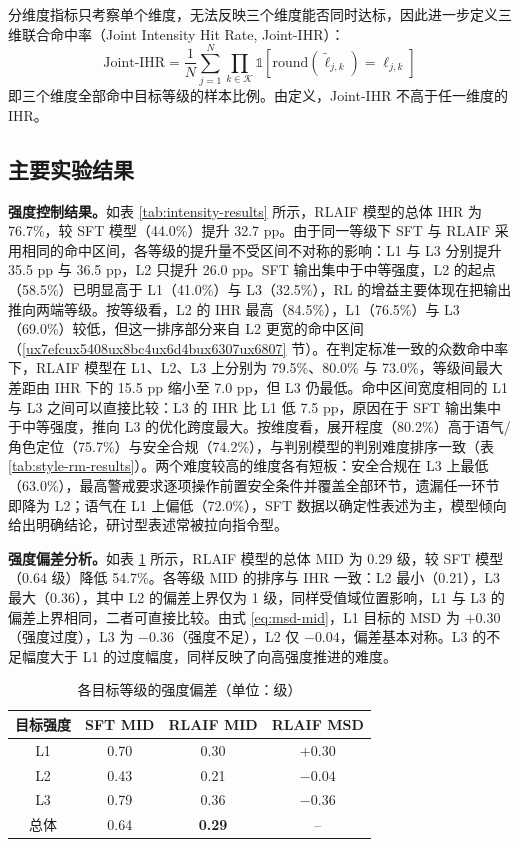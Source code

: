 \documentclass[fontset=fandol,type=master,campus=shenzhen,etitleauto=true]{hithesisbook}
\begin{document}
分维度指标只考察单个维度，无法反映三个维度能否同时达标，因此进一步定义三维联合命中率（Joint Intensity Hit Rate, Joint-IHR）：
\begin{equation}\label{eq:joint-ihr}
\text{Joint-IHR} = \frac{1}{N} \sum_{j=1}^{N} \prod_{k \in \mathcal{K}} \mathbb{1}\!\left[\text{round}(\tilde{\ell}_{j,k}) = \ell_{j,k}\right]
\end{equation}
即三个维度全部命中目标等级的样本比例。由定义，Joint-IHR 不高于任一维度的 IHR。

\subsection{主要实验结果}\label{ux4e3bux8981ux7ed3ux679c-1}

\textbf{强度控制结果。}如表 \ref{tab:intensity-results} 所示，RLAIF 模型的总体 IHR 为 76.7\%，较 SFT 模型（44.0\%）提升 32.7 pp。由于同一等级下 SFT 与 RLAIF 采用相同的命中区间，各等级的提升量不受区间不对称的影响：L1 与 L3 分别提升 35.5 pp 与 36.5 pp，L2 只提升 26.0 pp。SFT 输出集中于中等强度，L2 的起点（58.5\%）已明显高于 L1（41.0\%）与 L3（32.5\%），RL 的增益主要体现在把输出推向两端等级。按等级看，L2 的 IHR 最高（84.5\%），L1（76.5\%）与 L3（69.0\%）较低，但这一排序部分来自 L2 更宽的命中区间（\ref{ux7efcux5408ux8bc4ux6d4bux6307ux6807} 节）。在判定标准一致的众数命中率下，RLAIF 模型在 L1、L2、L3 上分别为 79.5\%、80.0\% 与 73.0\%，等级间最大差距由 IHR 下的 15.5 pp 缩小至 7.0 pp，但 L3 仍最低。命中区间宽度相同的 L1 与 L3 之间可以直接比较：L3 的 IHR 比 L1 低 7.5 pp，原因在于 SFT 输出集中于中等强度，推向 L3 的优化跨度最大。按维度看，展开程度（80.2\%）高于语气/角色定位（75.7\%）与安全合规（74.2\%），与判别模型的判别难度排序一致（表 \ref{tab:style-rm-results}）。两个难度较高的维度各有短板：安全合规在 L3 上最低（63.0\%），最高警戒要求逐项操作前置安全条件并覆盖全部环节，遗漏任一环节即降为 L2；语气在 L1 上偏低（72.0\%），SFT 数据以确定性表述为主，模型倾向给出明确结论，研讨型表述常被拉向指令型。

\textbf{强度偏差分析。}如表 \ref{tab:intensity-mid} 所示，RLAIF 模型的总体 MID 为 0.29 级，较 SFT 模型（0.64 级）降低 54.7\%。各等级 MID 的排序与 IHR 一致：L2 最小（0.21），L3 最大（0.36），其中 L2 的偏差上界仅为 1 级，同样受值域位置影响，L1 与 L3 的偏差上界相同，二者可直接比较。由式 \eqref{eq:msd-mid}，L1 目标的 MSD 为 $+0.30$（强度过度），L3 为 $-0.36$（强度不足），L2 仅 $-0.04$，偏差基本对称。L3 的不足幅度大于 L1 的过度幅度，同样反映了向高强度推进的难度。

\begin{table}[htbp]
\centering
\caption{各目标等级的强度偏差（单位：级）}
\label{tab:intensity-mid}
\small
\renewcommand{\arraystretch}{1.15}
\begin{tabular}{c c c c}
\toprule
\textbf{目标强度} & \textbf{SFT MID} & \textbf{RLAIF MID} & \textbf{RLAIF MSD} \\
\midrule
L1 & 0.70 & 0.30 & $+0.30$ \\
L2 & 0.43 & 0.21 & $-0.04$ \\
L3 & 0.79 & 0.36 & $-0.36$ \\
\midrule
总体 & 0.64 & \textbf{0.29} & -- \\
\bottomrule
\end{tabular}
\end{table}
\end{document}
